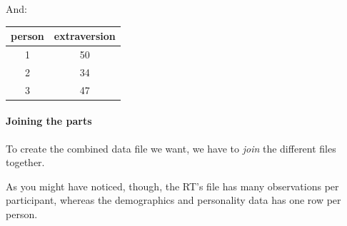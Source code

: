 \documentclass[]{article}
\newenvironment{Shaded}{\begin{snugshade}}{\end{snugshade}}
\newcommand{\KeywordTok}[1]{\textcolor[rgb]{0.13,0.29,0.53}{\textbf{#1}}}
\newcommand{\StringTok}[1]{\textcolor[rgb]{0.31,0.60,0.02}{#1}}
\newcommand{\OperatorTok}[1]{\textcolor[rgb]{0.81,0.36,0.00}{\textbf{#1}}}
\newcommand{\NormalTok}[1]{#1}
\let\oldparagraph\paragraph
\renewcommand{\paragraph}[1]{\oldparagraph{#1}\mbox{}}
\theoremstyle{definition}
\theoremstyle{definition}
\theoremstyle{definition}
\theoremstyle{remark}
\begin{document}
And:

\begin{Shaded}
\end{Shaded}

\begin{longtable}[]{@{}cc@{}}
\toprule
\begin{minipage}[b]{0.12\columnwidth}\centering\strut
person\strut
\end{minipage} & \begin{minipage}[b]{0.18\columnwidth}\centering\strut
extraversion\strut
\end{minipage}\tabularnewline
\midrule
\endhead
\begin{minipage}[t]{0.12\columnwidth}\centering\strut
1\strut
\end{minipage} & \begin{minipage}[t]{0.18\columnwidth}\centering\strut
50\strut
\end{minipage}\tabularnewline
\begin{minipage}[t]{0.12\columnwidth}\centering\strut
2\strut
\end{minipage} & \begin{minipage}[t]{0.18\columnwidth}\centering\strut
34\strut
\end{minipage}\tabularnewline
\begin{minipage}[t]{0.12\columnwidth}\centering\strut
3\strut
\end{minipage} & \begin{minipage}[t]{0.18\columnwidth}\centering\strut
47\strut
\end{minipage}\tabularnewline
\bottomrule
\end{longtable}

\paragraph{Joining the parts}\label{joining-the-parts}

To create the combined data file we want, we have to \emph{join} the
different files together.

As you might have noticed, though, the RT's file has many observations
per participant, whereas the demographics and personality data has one
row per person.
\end{document}

